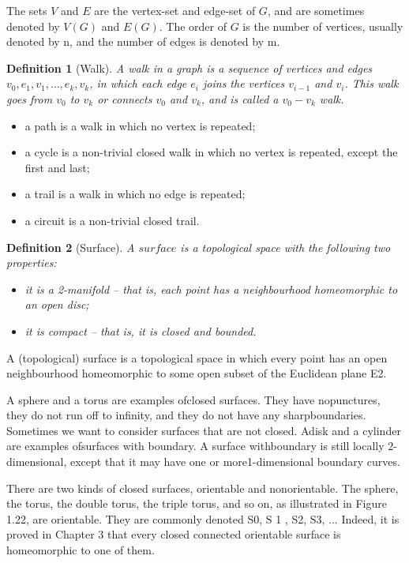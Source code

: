 \documentclass[10pt]{article}
\newtheorem{definition}{Definition}
\begin{document}
The sets $V$ and $E$ are the vertex-set and edge-set of $G$, and are sometimes denoted by $V(G)$ and $E(G)$. The order of $G$ is the number of vertices, usually denoted by n, and the number of edges is denoted by m.

\begin{definition}[Walk]
A walk in a graph is a sequence of vertices and edges $v_0, e_1, v_1, \dots, e_k, v_k$, in which each edge $e_i$ joins the vertices $v_{i-1}$ and $v_i$. This walk goes from $v_0$ to $v_k$ or connects $v_0$ and $v_k$, and is called a $v_0-v_k$ walk.
\end{definition}

\begin{itemize}
    \item a path is a walk in which no vertex is repeated;
    \item a cycle is a non-trivial closed walk in which no vertex is repeated, except the first and last;
    \item a trail is a walk in which no edge is repeated;
    \item a circuit is a non-trivial closed trail.
\end{itemize}

\begin{definition}[Surface]
A $surface$ is a topological space with the following two properties:
    \begin{itemize}
        \item it is a 2-manifold – that is, each point has a neighbourhood homeomorphic to an open disc;
        \item it is compact – that is, it is closed and bounded.
    \end{itemize}
\end{definition}

A (topological) surface is a topological space in which every point has an open neighbourhood homeomorphic to some open subset of the Euclidean plane E2.

A sphere and a torus are examples ofclosed surfaces. They have nopunctures, they do not run off to infinity, and they do not have any sharpboundaries. Sometimes we want to consider surfaces that are not closed. Adisk and a cylinder are examples ofsurfaces with boundary. A surface withboundary is still locally 2-dimensional, except that it may have one or more1-dimensional boundary curves.

There are two kinds of closed surfaces, orientable and nonorientable. The sphere, the torus, the double torus, the triple torus, and so on, as illustrated in Figure 1.22, are orientable. They are commonly denoted S0, S 1 , S2, S3, ... Indeed, it is proved in Chapter 3 that every closed connected orientable surface is homeomorphic to one of them. 
\end{document}
